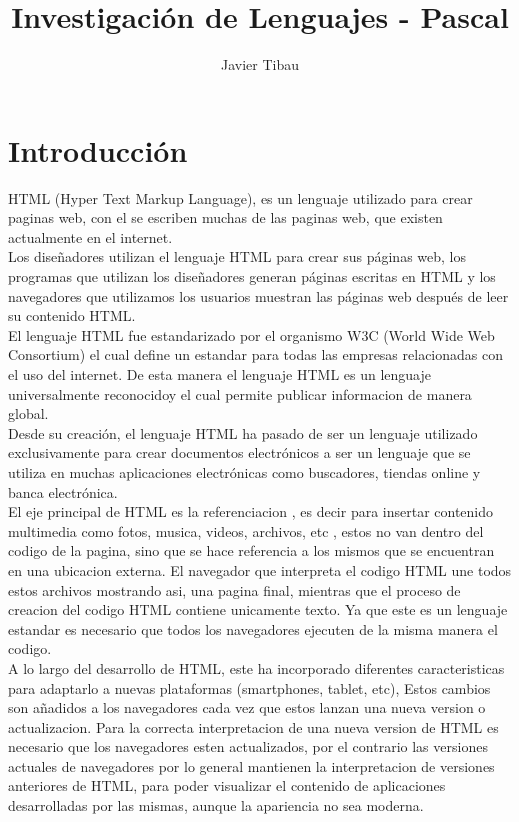 \documentclass[11pt]{article} %
\title{Investigación de Lenguajes - Pascal}
\author{Javier Tibau}
\begin{document}
\maketitle

\section{Introducción}
HTML (Hyper Text Markup Language), es un lenguaje utilizado para crear paginas web, con el se escriben muchas de las paginas web, que existen actualmente en el internet.\\

Los diseñadores utilizan el lenguaje HTML para crear sus páginas web, los programas que utilizan los diseñadores generan páginas escritas en HTML y los navegadores que utilizamos los usuarios muestran las páginas web después de leer su contenido HTML.\\
El lenguaje HTML fue estandarizado por el organismo W3C (World Wide Web Consortium) el cual define un estandar para todas las empresas relacionadas con el uso del internet. De esta manera el lenguaje HTML es un lenguaje universalmente reconocidoy el cual permite publicar informacion de manera global.\\

Desde su creación, el lenguaje HTML ha pasado de ser un lenguaje utilizado exclusivamente para crear documentos electrónicos a ser un lenguaje que se utiliza en muchas aplicaciones electrónicas como buscadores, tiendas online y banca electrónica.\\

El eje principal de HTML es la referenciacion , es decir para insertar contenido multimedia como fotos, musica, videos, archivos, etc , estos no van dentro del codigo de la pagina, sino que se hace referencia a los mismos que se encuentran en una ubicacion externa. El navegador que interpreta el codigo HTML une todos estos archivos mostrando asi, una pagina final, mientras que el proceso de creacion del codigo HTML contiene unicamente texto. Ya que este es un lenguaje estandar es necesario que todos los navegadores ejecuten de la misma manera el codigo.\\

A lo largo del desarrollo de HTML, este ha incorporado diferentes caracteristicas para adaptarlo a nuevas plataformas (smartphones, tablet, etc), Estos cambios son añadidos a los navegadores cada vez que estos lanzan una nueva version o actualizacion. Para la correcta interpretacion de una nueva version de HTML es necesario que los navegadores esten actualizados, por el contrario las versiones actuales de navegadores por lo general mantienen la interpretacion de versiones anteriores de HTML, para poder visualizar el contenido de aplicaciones desarrolladas por las mismas, aunque la apariencia no sea moderna.\\
\end{document}
